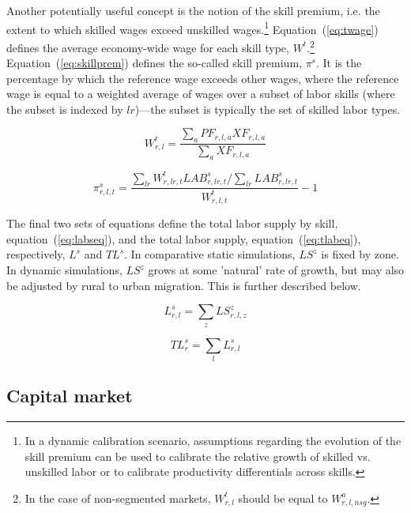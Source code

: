 \documentclass[11pt,letterpaper]{report}
\begin{document}
Another potentially useful concept is the notion of the skill premium, i.e. the
extent to which skilled wages exceed unskilled wages.\footnote{In a dynamic
calibration scenario, assumptions regarding the evolution of the skill premium
can be used to calibrate the relative growth of skilled vs. unskilled labor or
to calibrate productivity differentials across skills.}
Equation~(\ref{eq:twage}) defines the average economy-wide wage for each skill
type, $W^t$.\footnote{In the case of non-segmented markets, $W^t_{r,l}$ should
be equal to $W^a_{r,l,\mathit{nsg}}$.} Equation~(\ref{eq:skillprem}) defines the
so-called skill premium,  $\pi^s$. It is the percentage by which the reference
wage exceeds other wages, where the reference wage is equal to a weighted
average of wages over a subset of labor skills (where the subset is indexed by
$\mathit{lr}$)---the subset is typically the set of skilled labor types.

\begin{equation}
\label{eq:twage}
W^t_{r,l} =
   \displaystyle \frac{\sum_{a}{\mathit{PF}_{r,l,a} \mathit{XF}_{r,l,a}}}
      {\sum_{a}{\mathit{XF}_{r,l,a}}}
\end{equation}

\begin{equation}
\label{eq:skillprem}
\pi^s_{r,l,t} =
   \frac {  \sum_{\mathit{lr}} {
               W^t_{r,\mathit{lr},t}\mathit{LAB}^s_{r,\mathit{lr},t}
            }
   /  \sum_{\mathit{lr}} {
         \mathit{LAB}^s_{r,\mathit{lr},t}
      } } {W^t_{r,\mathit{l},t} } - 1
\end{equation}

The final two sets of equations define the total labor supply by skill,
equation~(\ref{eq:labseq}), and the total labor supply,
equation~(\ref{eq:tlabeq}), respectively, $\mathit{L}^s$ and $\mathit{TL}^s$. In
comparative static simulations, $\mathit{LS}^z$ is fixed by zone. In dynamic
simulations, $\mathit{LS}^z$ grows at some 'natural' rate of growth, but may
also be adjusted by rural to urban migration. This is further described below.

\begin{equation}
\label{eq:labseq}
\mathit{L}^s_{r,l} = \sum_z{\mathit{LS}^z_{r,l,z}}
\end{equation}

\begin{equation}
\label{eq:tlabeq}
\mathit{TL}^s_{r} = \sum_l{\mathit{L}^s_{r,l}}
\end{equation}

\subsection{Capital market}
\end{document}

